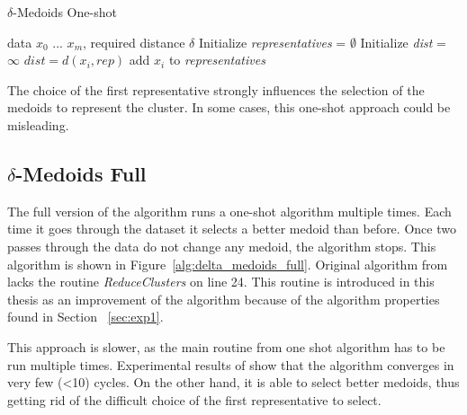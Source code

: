 \documentclass[thesis=B,english]{FITthesis}[2012/10/20]
\begin{document}
\begin{algorithm}
    \caption{$\delta$-Medoids One-shot}
    \label{alg:delta_medoids_one_shot}
    \begin{algorithmic}[1]
        \INPUT data $x_0$ ... $x_m$, required distance $\delta$
        \STATE Initialize \textit{representatives} = $\emptyset$
            \STATE Initialize \textit{dist} = $\infty$
                    \STATE $dist = d(x_i, rep)$
                \ENDIF
            \ENDFOR
                \STATE add $x_i$ to \textit{representatives}
            \ENDIF
        \ENDFOR
    \end{algorithmic}
\end{algorithm}


The choice of the first representative strongly influences the selection of the medoids to represent the cluster.
In some cases, this one-shot approach could be misleading.

\subsection{$\delta$-Medoids Full}

The full version of the algorithm runs a one-shot algorithm multiple times.
Each time it goes through the dataset it selects a better medoid than before.
Once two passes through the data do not change any medoid, the algorithm stops.
This algorithm is shown in Figure~\ref{alg:delta_medoids_full}.
Original algorithm from \cite{liebman2015representative} lacks the routine \textit{ReduceClusters} on line 24.
This routine is introduced in this thesis as an improvement of the algorithm because of the algorithm properties found in Section ~\ref{sec:exp1}.

This approach is slower, as the main routine from one shot algorithm has to be run multiple times.
Experimental results of \cite{liebman2015representative} show that the algorithm converges in very few (<10) cycles.
On the other hand, it is able to select better medoids, thus getting rid of the difficult choice of the first representative to select.
\end{document}
